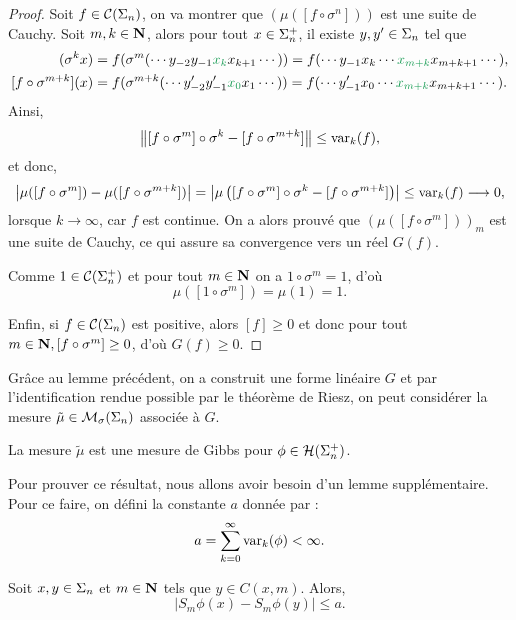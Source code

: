   \begin{proof}
    Soit $f \in \Cs{n}$, on va montrer que $(\mu([f\circ\sigma^n]))$ est une suite de Cauchy. Soit $m, k \in \N$,
    alors pour tout $x \in \sp_n$, il existe $y, y' \in \s_n$ tel que
    \begin{align*}
	[f\circ\sigma^m](\sigma^k x) &= f(\sigma^m(\cdots y_{-2}y_{-1}\textcolor{ForestGreen}{x_k}x_{k+1}\cdots))
		= f(\cdots y_{-1}x_k\cdots \textcolor{ForestGreen}{x_{m+k}}x_{m+k+1}\cdots), \\
	[f\circ\sigma^{m+k}](x) &= f(\sigma^{m+k}(\cdots y'_{-2}y'_{-1}\textcolor{ForestGreen}{x_0}x_1\cdots))
	    = f(\cdots y'_{-1}x_0\cdots\textcolor{ForestGreen}{x_{m+k}}x_{m+k+1}\cdots).
    \end{align*}
    Ainsi,
    $$\No{[f\circ\sigma^m]\circ\sigma^k - [f\circ\sigma^{m+k}]} \leq \var_k(f),$$
    et donc,
    $$\left| \mu([f\circ\sigma^m]) - \mu([f\circ\sigma^{m+k}]) \right| = \left|\mu\left([f\circ\sigma^m]\circ\sigma^k - [f\circ\sigma^{m+k}]\right) \right|
		\leq \var_k(f) \longrightarrow 0,$$
    lorsque $k \to \infty$, car $f$ est continue.
    On a alors prouvé que $(\mu([f\circ\sigma^m]))_m$ est une suite de Cauchy, ce qui assure sa convergence vers un réel $G(f)$.

    Comme $1 \in \Csp{n}$ et pour tout $m\in\N$ on a $1\circ\sigma^m = 1$, d'où
    $$\mu([1 \circ\sigma^m]) = \mu(1) = 1.$$

    Enfin, si $f \in \Cs{n}$ est positive, alors $[f] \geq 0$ et donc pour tout $m \in \N, [f \circ \sigma^m] \geq 0$,
    d'où $G(f) \geq 0$.
  \end{proof}

  Grâce au lemme précédent, on a construit une forme linéaire $G$ et par l'identification rendue possible par le théorème de Riesz,
  on peut considérer la mesure $\tilde{\mu} \in \Mss{n}$ associée à $G$.

  \begin{theorem}
    \label{thm:existence}
    La mesure $\tilde\mu$ est une mesure de Gibbs pour $\phi \in \Hsp{n}$.
  \end{theorem}

  Pour prouver ce résultat, nous allons avoir besoin d'un lemme supplémentaire. Pour ce faire, on défini la constante $a$ donnée par :
  $$a = \sum_{k=0}^{\infty}{\var_k(\phi)} < \infty.$$

  \begin{lemma}
    \label{lem:birkhoff_sum_ineq}
    Soit $x, y \in \s_n$ et $m \in \N$ tels que $y \in C(x, m)$.
    Alors,
    $$\left| S_m\phi(x) - S_m\phi(y)\right| \leq a.$$
  \end{lemma}

